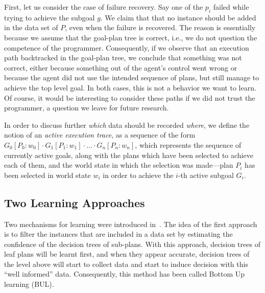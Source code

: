 \documentclass{article}
\begin{document}
First, let us consider the case of failure recovery. Say one of the
$p_i$ failed while trying to achieve the subgoal $g$.  We claim that
that no instance should be added in the data set of $P$, even when the
failure is recovered.  The reason is essentially because we assume
that the goal-plan tree is correct, i.e., we do not question the
competence of the programmer.  Consequently, if we observe that an
execution path backtracked in the goal-plan tree, we conclude that
something was not correct, either because something out of the agent's
control went wrong or because the agent did not use the intended
sequence of plans, but still manage to achieve the top level goal. In
both cases, this is not a behavior we want to learn.  Of course, it
would be interesting to consider these paths if we did not trust the
programmer, a question we leave for future research.

In order to discuss further \emph{which} data should be recorded
\emph{where}, we define the notion of an \textit{active execution
  trace}, as a sequence of the form $G_0[P_0:w_0] \cdot G_1[P_1:w_1]
\cdot \ldots \cdot G_n[P_n:w_n]$, which represents the sequence of
currently active goals, along with the plans which have been selected
to achieve each of them, and the world state in which the selection
was made---plan $P_i$ has been selected in world state $w_i$ in order
to achieve the $i$-th active subgoal $G_i$.

\subsection{Two Learning Approaches}
\newcommand{\success}{\mbox{\emph{succ}}}
\newcommand{\failure}{\mbox{\emph{fail}}}
\newcommand{\procedurefont}[1]{\mathsf{#1}}
\newcommand{\StableGoal}{\procedurefont{StableGoal}}
\newcommand{\RecordTrace}{\procedurefont{RecordFailedTrace}}
\newcommand{\RecordWorldDT}{\procedurefont{RecordWorldDT}}

Two mechanisms for learning were introduced
in~\cite{Singh10:Learning}. The idea of the first approach is to
filter the instances that are included in a data set by estimating the
confidence of the decision trees of sub-plans. With this approach,
decision trees of leaf plans will be learnt first, and when they
appear accurate, decision trees of the level above will start to
collect data and start to induce decision with this ``well informed''
data. Consequently, this method has been called Bottom Up learning
(BUL).
\end{document}
